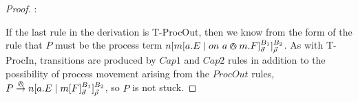 \begin{proof}
:

\noindent If the last rule in the derivation is T-ProcOut, then we
know from the form of the rule that $P$ must be the process term
${n}[ {m}[ a.E \;|\;
    on\ a \varowedge m.F ]^{B_1}_{\vec{\sigma}} ]^{B_2}_{\vec{\rho}}$.  As with
T-ProcIn, transitions are produced by $Cap1$ and $Cap2$ rules in
addition to the possibility of process movement arising from the
$ProcOut$ rules, $P \stackrel{\varowedge}{\rightarrow} {n}[ a.E \;|\;
  {m}[ F ]^{B_1}_{\vec{\sigma}} ]^{B_2}_{\vec{\rho}}$, so $P$ is not stuck.

\end{proof}
